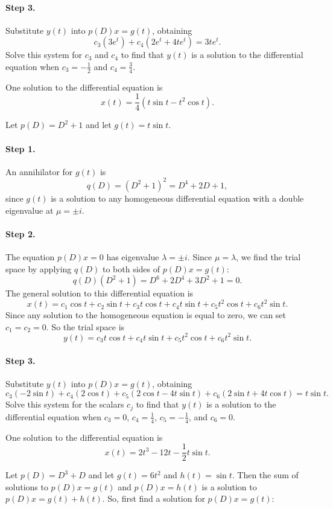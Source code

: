 \paragraph{Step 3.} Substitute $y(t)$ into $p(D)x = g(t)$, obtaining
\[
c_3(3e^t) + c_4(2e^t + 4te^t) = 3te^t.
\]
Solve this system for $c_3$ and $c_4$ to find that $y(t)$ is a solution
to the differential equation when $c_3 = -\frac{1}{2}$ and
$c_4 = \frac{3}{4}$.

 \ans One solution to the differential equation is
\[
x(t) = \frac{1}{4}(t\sin t- t^2\cos t).
\]

\soln Let $p(D) = D^2 + 1$ and let $g(t) = t\sin t$.
\paragraph{Step 1.} An annihilator for $g(t)$ is
\[
q(D) = (D^2 + 1)^2 = D^4 + 2D + 1,
\]
since $g(t)$ is a solution to any homogeneous differential equation
with a double eigenvalue at $\mu = \pm i$.

\paragraph{Step 2.} The equation $p(D)x = 0$ has eigenvalue $\lambda =
\pm i$.  Since $\mu = \lambda$, we find the trial space by applying
$q(D)$ to both sides of $p(D)x = g(t)$:
\[
q(D)(D^2 + 1) = D^6 + 2D^4 + 3D^2 + 1 = 0.
\]
The general solution to this differential equation is
\[
x(t) = c_1\cos t + c_2\sin t + c_3t\cos t + c_4t\sin t + c_5t^2\cos t
+ c_6t^2\sin t.
\]
Since any solution to the homogeneous equation is equal to zero, we can
set $c_1 = c_2 = 0$.  So the trial space is
\[
y(t) = c_3t\cos t + c_4t\sin t + c_5t^2\cos t + c_6t^2\sin t.
\]
\paragraph{Step 3.} Substitute $y(t)$ into $p(D)x = g(t)$, obtaining
\[
c_3(-2\sin t) + c_4(2\cos t) + c_5(2\cos t - 4t\sin t) +
c_6(2\sin t + 4t\cos t) = t\sin t.
\]
Solve this system for the scalars $c_j$ to find that $y(t)$ is a solution
to the differential equation when $c_3 = 0$, $c_4 = \frac{1}{4}$,
$c_5 = -\frac{1}{4}$, and $c_6 = 0$.

 \ans One solution to the differential equation is
\[
x(t) = 2t^3 - 12t - \frac{1}{2}t\sin t.
\]

\soln Let $p(D) = D^3 + D$ and let $g(t) = 6t^2$ and $h(t) = \sin t$.  Then
the sum of solutions to $p(D)x = g(t)$ and $p(D)x = h(t)$ is a solution to
$p(D)x = g(t) + h(t)$.  So, first find a solution for $p(D)x = g(t)$:
